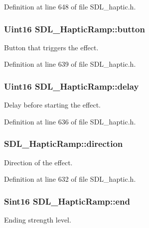 Definition at line 648 of file S\+D\+L\+\_\+haptic.\+h.

\hypertarget{structSDL__HapticRamp_a2027c6fd88f1ebe652c90c71410ee0bf}{
\subsubsection[{button}]{\setlength{\rightskip}{0pt plus 5cm}Uint16 S\+D\+L\+\_\+\+Haptic\+Ramp\+::button}}\label{structSDL__HapticRamp_a2027c6fd88f1ebe652c90c71410ee0bf}
Button that triggers the effect. 

Definition at line 639 of file S\+D\+L\+\_\+haptic.\+h.

\hypertarget{structSDL__HapticRamp_ac9471016f41919b4a1c786bbd649a777}{
\subsubsection[{delay}]{\setlength{\rightskip}{0pt plus 5cm}Uint16 S\+D\+L\+\_\+\+Haptic\+Ramp\+::delay}}\label{structSDL__HapticRamp_ac9471016f41919b4a1c786bbd649a777}
Delay before starting the effect. 

Definition at line 636 of file S\+D\+L\+\_\+haptic.\+h.

\hypertarget{structSDL__HapticRamp_a6fb6c67ccf262b8f3ec08bcdf08f9965}{
\subsubsection[{direction}]{ S\+D\+L\+\_\+\+Haptic\+Ramp\+::direction}}\label{structSDL__HapticRamp_a6fb6c67ccf262b8f3ec08bcdf08f9965}
Direction of the effect. 

Definition at line 632 of file S\+D\+L\+\_\+haptic.\+h.

\hypertarget{structSDL__HapticRamp_a16dd3ee307795248e21ee45ba8fb4c6c}{
\subsubsection[{end}]{\setlength{\rightskip}{0pt plus 5cm}Sint16 S\+D\+L\+\_\+\+Haptic\+Ramp\+::end}}\label{structSDL__HapticRamp_a16dd3ee307795248e21ee45ba8fb4c6c}
Ending strength level. 

